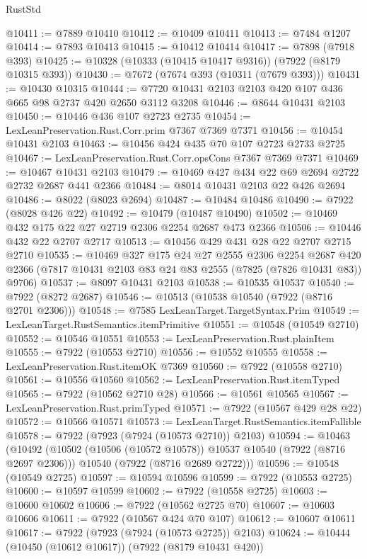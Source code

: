\begin{lexlean}{RustStd}
\begin{coremodule}
@10411 := @7889 @10410
@10412 := @10409 @10411
@10413 := @7484 @1207
@10414 := @7893 @10413
@10415 := @10412 @10414
@10417 := @7898 (@7918 @393)
@10425 := @10328 (@10333 (@10415 @10417 @9316)) (@7922 (@8179 @10315 @393))
@10430 := @7672 (@7674 @393 (@10311 (@7679 @393)))
@10431 := @10430 @10315
@10444 := @7720 @10431 @2103 @2103 @420 @107 @436 @665 @98 @2737 @420 @2650 @3112 @3208
@10446 := @8644 @10431 @2103
@10450 := @10446 @436 @107 @2723 @2735
@10454 := LexLeanPreservation.Rust.Corr.prim @7367 @7369 @7371
@10456 := @10454 @10431 @2103
@10463 := @10456 @424 @435 @70 @107 @2723 @2733 @2725
@10467 := LexLeanPreservation.Rust.Corr.opsCons @7367 @7369 @7371
@10469 := @10467 @10431 @2103
@10479 := @10469 @427 @434 @22 @69 @2694 @2722 @2732 @2687 @441 @2366
@10484 := @8014 @10431 @2103 @22 @426 @2694
@10486 := @8022 (@8023 @2694)
@10487 := @10484 @10486
@10490 := @7922 (@8028 @426 @22)
@10492 := @10479 (@10487 @10490)
@10502 := @10469 @432 @175 @22 @27 @2719 @2306 @2254 @2687 @473 @2366
@10506 := @10446 @432 @22 @2707 @2717
@10513 := @10456 @429 @431 @28 @22 @2707 @2715 @2710
@10535 := @10469
    @327
    @175
    @24
    @27
    @2555
    @2306
    @2254
    @2687
    @420
    @2366
    (@7817 @10431 @2103 @83 @24 @83 @2555 (@7825 (@7826 @10431 @83)) @9706)
@10537 := @8097 @10431 @2103
@10538 := @10535 @10537
@10540 := @7922 (@8272 @2687)
@10546 := @10513 (@10538 @10540 (@7922 (@8716 @2701 @2306)))
@10548 := @7585 LexLeanTarget.TargetSyntax.Prim
@10549 := LexLeanTarget.RustSemantics.itemPrimitive
@10551 := @10548 (@10549 @2710)
@10552 := @10546 @10551
@10553 := LexLeanPreservation.Rust.plainItem
@10555 := @7922 (@10553 @2710)
@10556 := @10552 @10555
@10558 := LexLeanPreservation.Rust.itemOK @7369
@10560 := @7922 (@10558 @2710)
@10561 := @10556 @10560
@10562 := LexLeanPreservation.Rust.itemTyped
@10565 := @7922 (@10562 @2710 @28)
@10566 := @10561 @10565
@10567 := LexLeanPreservation.Rust.primTyped
@10571 := @7922 (@10567 @429 @28 @22)
@10572 := @10566 @10571
@10573 := LexLeanTarget.RustSemantics.itemFallible
@10578 := @7922 (@7923 (@7924 (@10573 @2710)) @2103)
@10594 := @10463
    (@10492
      (@10502 (@10506 (@10572 @10578)) @10537 @10540 (@7922 (@8716 @2697 @2306)))
      @10540
      (@7922 (@8716 @2689 @2722)))
@10596 := @10548 (@10549 @2725)
@10597 := @10594 @10596
@10599 := @7922 (@10553 @2725)
@10600 := @10597 @10599
@10602 := @7922 (@10558 @2725)
@10603 := @10600 @10602
@10606 := @7922 (@10562 @2725 @70)
@10607 := @10603 @10606
@10611 := @7922 (@10567 @424 @70 @107)
@10612 := @10607 @10611
@10617 := @7922 (@7923 (@7924 (@10573 @2725)) @2103)
@10624 := @10444 (@10450 (@10612 @10617)) (@7922 (@8179 @10431 @420))

\end{coremodule}
\end{lexlean}
